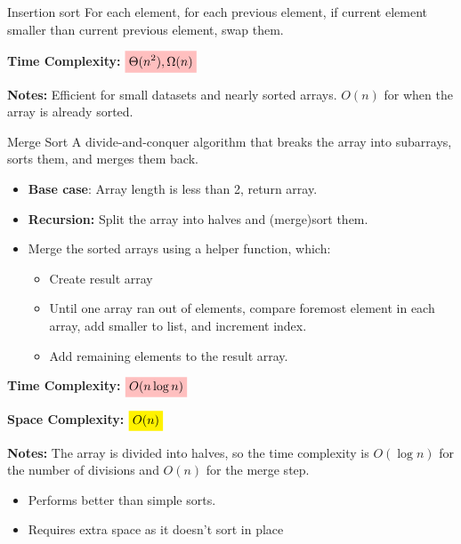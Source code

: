 \begin{definition}
    {Insertion sort}
    For each element, for each previous element, if current element smaller than current previous element, swap them.

    \textbf{Time Complexity:} $\mathcolorbox{pink}{\Theta(n^2),\Omega(n)}$

    \textbf{Notes:} Efficient for small datasets and nearly sorted arrays. $O(n)$ for when the array is already sorted.
\end{definition}


\begin{definition}
    {Merge Sort}
    A divide-and-conquer algorithm that breaks the array into subarrays, sorts them, and merges them back.

    \begin{itemize}
        \item \textbf{Base case}: Array length is less than 2, return array.
        \item \textbf{Recursion:} Split the array into halves and (merge)sort them.
        \item Merge the sorted arrays using a helper function, which:
              \begin{itemize}
                  \item Create result array
                  \item Until one array ran out of elements, compare foremost element in each array, add smaller to list, and increment index.
                  \item Add remaining elements to the result array.
              \end{itemize}
    \end{itemize}

    \textbf{Time Complexity:} $\mathcolorbox{pink}{O(n \log n)}$

    \textbf{Space Complexity:} $\mathcolorbox{yellow}{O(n)}$

    \textbf{Notes:} The array is divided into halves, so the time complexity is $O(\log n)$ for the number of divisions and $O(n)$ for the merge step.
    \begin{itemize}
        \item Performs better than simple sorts.
        \item Requires extra space as it doesn't sort in place
    \end{itemize}
\end{definition}

